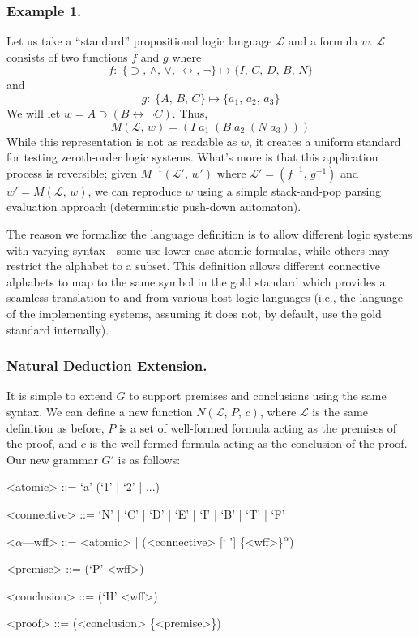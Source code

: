 \documentclass[ms]{uncgdissertationexp2}
\theoremstyle{plain}
\theoremstyle{definition}
\theoremstyle{remark}
\begin{document}
    \subsubsection{Example 1.} Let us take a ``standard'' propositional logic language $\mathcal{L}$ and a formula $w$. $\mathcal{L}$ consists of two functions $f$ and $g$ where
    \[
        f:\;\{\supset,\,\land,\,\lor,\,\leftrightarrow,\,\lnot\}\mapsto \{I,\,C,\,D,\,B,\,N\}
    \]
    and 
    \[
    g:\;\{A,\,B,\,C\} \mapsto \{a_{1},\,a_{2},\,a_{3}\}
    \] 
    We will let $w = A \supset (B \leftrightarrow \lnot C)$. Thus, 
    \[
        M(\mathcal{L},\,w) = (I\;a_{1}\;(B\;a_{2}\;(N\;a_{3})))
    \]
    While this representation is not as readable as $w$, it creates a uniform standard for testing zeroth-order logic systems. What's more is that this application process is reversible; given $M^{-1}(\mathcal{L}',\,w')$ where $\mathcal{L}' = (f^{-1},\,g^{-1})$ and $w' = M(\mathcal{L},\,w)$, we can reproduce $w$ using a simple stack-and-pop parsing evaluation approach (deterministic push-down automaton).
    
    The reason we formalize the language definition is to allow different logic systems with varying syntax---some use lower-case atomic formulas, while others may restrict the alphabet to a subset. This definition allows different connective alphabets to map to the same symbol in the gold standard which provides a seamless translation to and from various host logic languages (i.e., the language of the implementing systems, assuming it does not, by default, use the gold standard internally).

    \subsubsection{Natural Deduction Extension.} It is simple to extend $G$ to support premises and conclusions using the same syntax. We can define a new function $N(\mathcal{L},\,P,\,c)$, where $\mathcal{L}$ is the same definition as before, $P$ is a set of well-formed formula acting as the premises of the proof, and $c$ is the well-formed formula acting as the conclusion of the proof. Our new grammar $G'$ is as follows:

\begin{grammar}
<atomic> ::= `a' (`1' | `2' | ...)

<connective> ::= `N' | `C' | `D' | `E' | `I' | `B' | `T' | `F' 

<$\alpha$---wff> ::= <atomic> | (<connective> [` '] \{<wff>\}$^{\alpha}$)

<premise> ::= (`P' <wff>)

<conclusion> ::= (`H' <wff>)

<proof> ::= (<conclusion> \{<premise>\})
\end{grammar}
\end{document}
